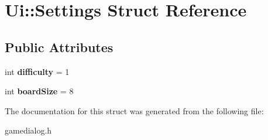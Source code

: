 \hypertarget{struct_ui_1_1_settings}{}\section{Ui\+:\+:Settings Struct Reference}
\label{struct_ui_1_1_settings}
\subsection*{Public Attributes}
\begin{DoxyCompactItemize}
\item 
\hypertarget{struct_ui_1_1_settings_a88c0666d27a688b854313d4e8be84ce4}{}int {\bfseries difficulty} = 1\label{struct_ui_1_1_settings_a88c0666d27a688b854313d4e8be84ce4}

\item 
\hypertarget{struct_ui_1_1_settings_aa322f139c01a4a7bb2cb803d53d11702}{}int {\bfseries board\+Size} = 8\label{struct_ui_1_1_settings_aa322f139c01a4a7bb2cb803d53d11702}

\end{DoxyCompactItemize}


The documentation for this struct was generated from the following file\+:\begin{DoxyCompactItemize}
\item 
gamedialog.\+h\end{DoxyCompactItemize}
